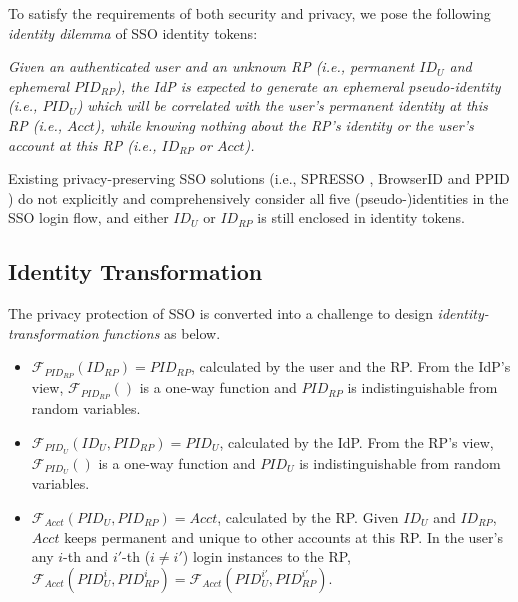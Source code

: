 To satisfy the requirements of both security and privacy,
     we pose the following \emph{identity dilemma} of SSO identity tokens:

\noindent\emph{Given an authenticated user and an unknown RP (i.e., permanent $ID_U$ and ephemeral $PID_{RP}$),
    the IdP is expected to generate an ephemeral pseudo-identity (i.e., $PID_{U}$)
     which will be correlated with the user's permanent identity at this RP (i.e., $Acct$),
     while knowing nothing about the RP's identity or the user's account at this RP (i.e., $ID_{RP}$ or $Acct$).}

Existing privacy-preserving SSO solutions (i.e., SPRESSO \cite{SPRESSO}, BrowserID \cite{BrowserID} and PPID \cite{NIST2017draft})
  do not explicitly and comprehensively consider all five (pseudo-)identities in the SSO login flow,
    and either $ID_U$ or $ID_{RP}$ is still enclosed in identity tokens.


\subsection{Identity Transformation}
\label{subsec:solutions}



The privacy protection of SSO is converted into a challenge
 to design \emph{identity-transformation functions} as below.
\vspace{-\topsep}\begin{itemize}
\setlength{\topsep}{0pt}
\setlength{\partopsep}{0pt}
\setlength{\itemsep}{0pt}
\setlength{\parsep}{0pt}
\setlength{\parskip}{0pt}
\item
$\mathcal{F}_{PID_{RP}}(ID_{RP}) = PID_{RP}$, calculated by the user and the RP.
From the IdP's view,
$\mathcal{F}_{PID_{RP}}()$ is a one-way function and $PID_{RP}$
is indistinguishable from random variables.
\item
$\mathcal{F}_{PID_U}(ID_U, PID_{RP}) = PID_{U}$, calculated by the IdP.
From the RP's view,
    $\mathcal{F}_{PID_U}()$ is a one-way function and $PID_{U}$ is indistinguishable from random variables.
\item
$\mathcal{F}_{Acct}(PID_{U}, PID_{RP}) = Acct$, calculated by the RP.
Given $ID_U$ and $ID_{RP}$, $Acct$ keeps permanent and unique to other accounts at this RP.
In the user's any $i$-th and $i'$-th ($i \neq i'$) login instances to the RP,
 $\mathcal{F}_{Acct}(PID_{U}^i, PID_{RP}^i) = \mathcal{F}_{Acct}(PID_{U}^{i'}, PID_{RP}^{i'})$.
\end{itemize}

